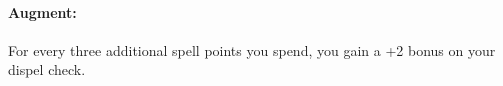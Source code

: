 \paragraph{Augment:} For every three additional spell points you spend, you gain a +2 bonus on your dispel check.
% 
% 
% 
